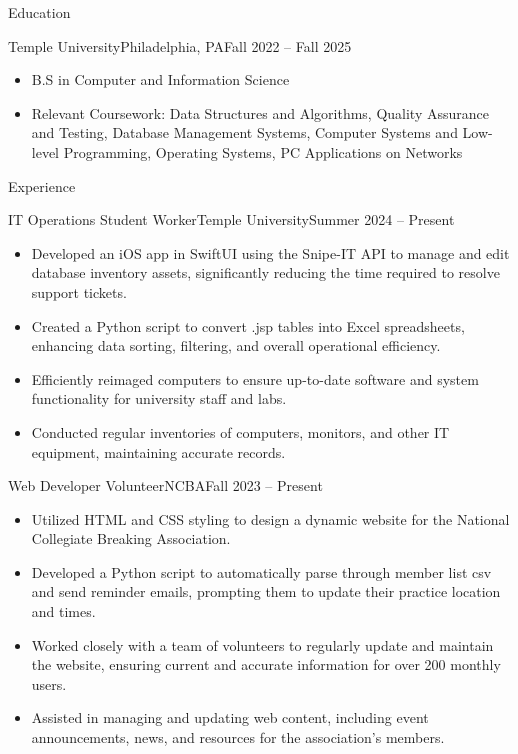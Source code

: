 \documentclass[]{mcdowellcv}
\begin{document}
	\makeheader
	
	

	\begin{cvsection}{Education}
		\begin{cvsubsection}{Temple University}{Philadelphia, PA}{Fall 2022 -- Fall 2025}
			\begin{itemize}
				\item B.S in Computer and Information Science
				\item Relevant Coursework: Data Structures and Algorithms, Quality Assurance and Testing, Database Management Systems, Computer Systems and Low-level Programming, Operating Systems, PC Applications on Networks
			\end{itemize}
		\end{cvsubsection}
	\end{cvsection}

	\begin{cvsection}{Experience}
		\begin{cvsubsection}{IT Operations Student Worker}{Temple University}{Summer 2024 -- Present}			
			\begin{itemize}
				\item Developed an iOS app in SwiftUI using the Snipe-IT API to manage and edit database inventory assets, significantly reducing the time required to resolve support tickets.
				\item Created a Python script to convert .jsp tables into Excel spreadsheets, enhancing data sorting, filtering, and overall operational efficiency.
				\item Efficiently reimaged computers to ensure up-to-date software and system functionality for university staff and labs.
				\item Conducted regular inventories of computers, monitors, and other IT equipment, maintaining accurate records.
			\end{itemize}
		\end{cvsubsection}
		
		\begin{cvsubsection}{Web Developer Volunteer}{NCBA}{Fall 2023 -- Present}	
			\begin{itemize}
				\item Utilized HTML and CSS styling to design a dynamic website for the National Collegiate Breaking Association.
				\item Developed a Python script to automatically parse through member list csv and send reminder emails, prompting them to update their practice location and times.
				\item Worked closely with a team of volunteers to regularly update and maintain the website, ensuring current and accurate information for over 200 monthly users.
				\item Assisted in managing and updating web content, including event announcements, news, and resources for the association's members.
			\end{itemize}
		\end{cvsubsection}
	\end{cvsection}
\end{document}
